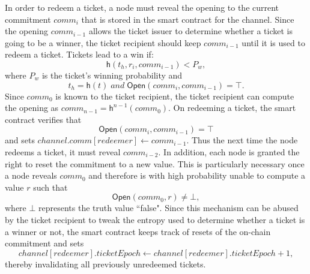 In order to redeem a ticket, a node must reveal the opening to the current commitment $comm_i$ that is stored in the smart contract for the channel. Since the opening $comm_{i-1}$ allows the ticket issuer to determine whether a ticket is going to be a winner, the ticket recipient should keep $comm_{i-1}$ until it is used to redeem a ticket. Tickets lead to a win if: $$\mathsf{h}( t_h, r_i, comm_{i-1} ) < P_w,$$ where $P_w$ is the ticket's winning probability and $$t_h=\mathsf{h}(t) \;and\; \mathsf{Open}(comm_i, comm_{i-1}) = \top.$$ Since $comm_{0}$ is known to the ticket recipient, the ticket recipient can compute the opening as $comm_{n-1} = \mathsf{h}^{n-1}(comm_0)$. On redeeming a ticket, the smart contract verifies that $$\mathsf{Open}(comm_i, comm_{i-1}) = \top$$ and sets $channel.comm[redeemer] \leftarrow comm_{i-1}$. Thus the next time the node redeems a ticket, it must reveal $comm_{i-2}$. In addition, each node is granted the right to reset the commitment to a new value. This is particularly necessary once a node reveals $comm_0$ and therefore is with high probability unable to compute a value $r$ such that $$\mathsf{Open}(comm_0,r) \neq \bot,$$ where $\bot$ represents the truth value ``false". Since this mechanism can be abused by the ticket recipient to tweak the entropy used to determine whether a ticket is a winner or not, the smart contract keeps track of resets of the on-chain commitment and sets $$channel[redeemer].ticketEpoch \leftarrow channel[redeemer].ticketEpoch +1 ,$$ thereby invalidating all previously unredeemed tickets.
